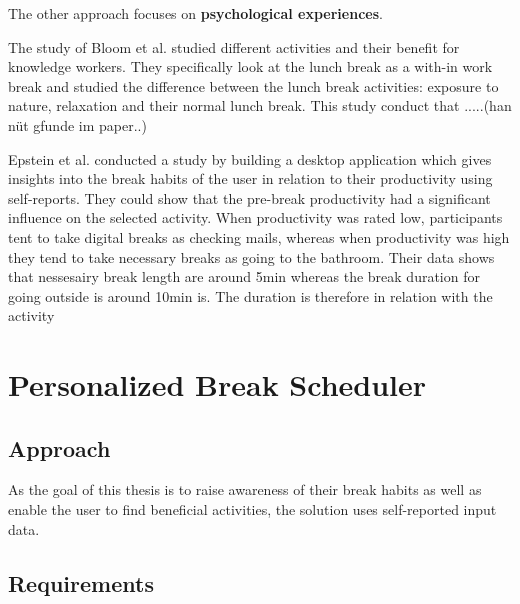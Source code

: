 \documentclass{hasel_thesis}
\begin{document}
The other approach focuses on \textbf{psychological experiences}.


The study of Bloom et al. \cite{Bloom.2014} studied different activities and their benefit for knowledge workers. They specifically look at the lunch break as a with-in work break and studied the difference between the lunch break activities: exposure to nature, relaxation and their normal lunch break. This study conduct that .....(han nüt gfunde im paper..)

Epstein et al. \cite{epstein.2016t} conducted a study by building a desktop application which gives insights into the break habits of the user in relation to their productivity using self-reports. They could show that the pre-break productivity had a significant influence on the selected activity. When productivity was rated low, participants tent to take digital breaks as checking mails, whereas when productivity was high they tend to take necessary breaks as going to the bathroom. Their data shows that nessesairy break length are around 5min whereas the break duration for going outside is around 10min is. The duration is therefore in relation with the activity

\chapter{Personalized Break Scheduler}
\section{Approach}

\begin{comment} 
Contrary, studies have shown that employees which have a high job control and no formally scheduled breaks, often do not take any breaks and overwork themselves \cite{McLean.2001}. They fail to take a break when needed, so they only take breaks when their resources are already really low. If they then engage in breaks activities, mostly it is not enough anymore to take short breaks but need an extended break.
- notification is good so that people do not forget to take breaks (take positiv of high job demand but elimit the bad of not having scheduled breaks)
\end{comment}

As the goal of this thesis is to raise awareness of their break habits as well as enable the user to find beneficial activities, the solution uses self-reported input data. 

\section{Requirements}
\end{document}
